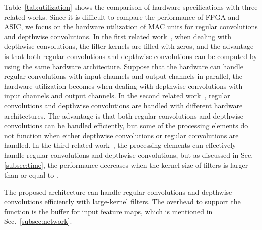 \documentclass[runningheads]{llncs}
\begin{document}
Table~\ref{tab:utilization} shows the comparison of hardware specifications with three related works. Since it is difficult to compare the performance of FPGA and ASIC, we focus on the hardware utilization of MAC units for regular convolutions and depthwise convolutions. In the first related work~\cite{Liu19}, when dealing with depthwise convolutions, the filter kernels are filled with zeros, and the advantage is that both regular convolutions and depthwise convolutions can be computed by using the same hardware architecture. Suppose that the hardware can handle regular convolutions with  input channels and  output channels in parallel, the hardware utilization becomes  when dealing with depthwise convolutions with  input channels and  output channels. In the second related work~\cite{Su18}, regular convolutions and depthwise convolutions are handled with different hardware architectures. The advantage is that both regular convolutions and depthwise convolutions can be handled efficiently, but some of the processing elements do not function when either depthwise convolutions or regular convolutions are handled. In the third related work~\cite{Yu20}, the processing elements can effectively handle regular convolutions and depthwise convolutions, but as discussed in Sec. \ref{subsec:time}, the performance decreases when the kernel size of filters is larger than or equal to .

The proposed architecture can handle regular convolutions and depthwise convolutions efficiently with large-kernel filters. The overhead to support the function is the buffer for input feature maps, which is mentioned in Sec.~\ref{subsec:network}. 
\end{document}
